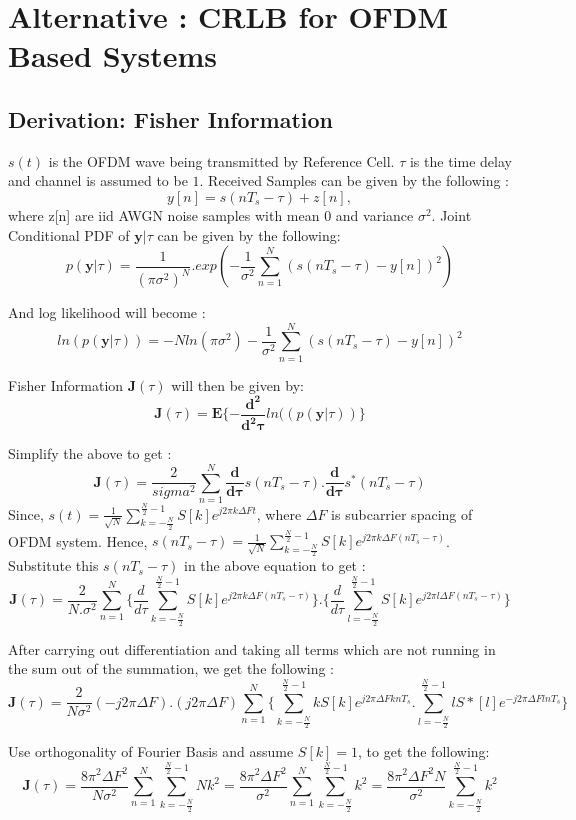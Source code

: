 \documentclass{article}
\begin{document}
\newpage
\section{Alternative : CRLB for OFDM Based Systems}
\subsection{Derivation: Fisher Information}
$s(t)$ is the OFDM wave being transmitted by Reference Cell. $\tau$ is the time delay and channel is assumed to be $1$. Received Samples can be given by the following :$$y[n] = s(nT_s - \tau) + z[n],$$where z[n] are iid AWGN noise samples with mean $0$ and variance $\sigma^2$.  
Joint Conditional PDF of $\mathbf y|\tau$ can be given by the following:
$$p(\mathbf y|\tau) = \frac{1}{(\pi \sigma^2)^N} .exp(-\frac{1}{\sigma^2}\sum^{N}_{n=1}(s(n T_s - \tau) - y[n])^2)$$

And log likelihood will become :
$$ln(p(\mathbf y|\tau)) = -N ln(\pi \sigma^2) -\frac{1}{\sigma^2}\sum^{N}_{n=1}(s(nT_s - \tau) - y[n])^2$$

Fisher Information $\mathbf J(\tau)$ will then be given by:
$$\mathbf{J}(\tau) = \mathbf E\{ - \mathbf{\frac{d^2}{d^2\tau}}ln((p(\mathbf y|\tau)) \}$$

Simplify the above to get :
$$\mathbf{J}(\tau) = \frac{2}{sigma^2}\sum^{N}_{n=1}\mathbf{\frac{d}{d\tau}}s(n T_s - \tau).\mathbf{\frac{d}{d\tau}}s^*(n T_s - \tau)$$
Since, $s(t) = \frac{1}{\sqrt{N}}\sum^{\frac{N}{2} - 1}_{k=-\frac{N}{2}}S[k]e^{j2\pi k\Delta F t}$, where $\Delta F$ is subcarrier spacing of OFDM system. Hence, $s(n T_s - \tau) = \frac{1}{\sqrt{N}}\sum^{\frac{N}{2} - 1}_{k=-\frac{N}{2}}S[k]e^{j2\pi k\Delta F (n T_s - \tau)}$. Substitute this $s(n T_s - \tau)$ in the above equation to get : 
$$\mathbf{J}(\tau) = \frac{2}{N.\sigma^2} \sum^{N}_{n=1}\{\frac{d}{d\tau}\sum^{\frac{N}{2} - 1}_{k=-\frac{N}{2}}S[k]e^{j2\pi k\Delta F (n T_s - \tau)}\}.\{\frac{d}{d\tau}\sum^{\frac{N}{2} - 1}_{l=-\frac{N}{2}}S[k]e^{j2\pi l\Delta F (n T_s - \tau)}\}$$

After carrying out differentiation and taking all terms which are not running in the sum out of the summation, we get the following :
$$\mathbf{J}(\tau) = \frac{2}{N\sigma^2}(-j2\pi \Delta F).(j2\pi \Delta F)\sum^{N}_{n=1} \{\sum^{\frac{N}{2} - 1}_{k=-\frac{N}{2}}k S[k]e^{j2\pi \Delta F k n T_s}.\sum^{\frac{N}{2} - 1}_{l=-\frac{N}{2}}l S*[l]e^{-j2\pi \Delta F l n T_s}\}$$

Use orthogonality of Fourier Basis and assume $S[k] = 1$, to get the following:
$$\mathbf{J}(\tau) = \frac{8\pi^2 \Delta F^2}{N\sigma^2} \sum^{N}_{n=1} \sum^{\frac{N}{2} - 1}_{k=-\frac{N}{2}}N k^2 = \frac{8\pi^2 \Delta F^2}{\sigma^2} \sum^{N}_{n=1} \sum^{\frac{N}{2} - 1}_{k=-\frac{N}{2}}k^2 = \frac{8\pi^2 \Delta F^2 N}{\sigma^2}\sum^{\frac{N}{2} - 1}_{k=-\frac{N}{2}}k^2$$
\end{document}
